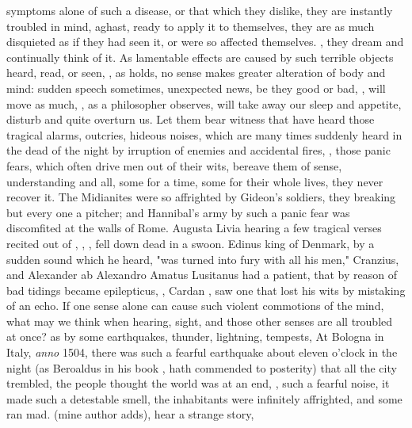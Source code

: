 symptoms alone of such a disease, or that which they dislike, they are
instantly troubled in mind, aghast, ready to apply it to themselves, they are
as much disquieted as if they had seen it, or were so affected themselves.
, they dream and continually think of it. As
lamentable effects are caused by such terrible objects heard, read, or seen,
, as \Plutarch{}
holds, no sense makes greater alteration of body and mind: sudden speech
sometimes, unexpected news, be they good or bad, ,
will move as much, , as a
philosopher observes, will take away our sleep and
appetite, disturb and quite overturn us. Let them bear witness that have heard
those tragical alarms, outcries, hideous noises, which are many times suddenly
heard in the dead of the night by irruption of enemies and accidental fires,
\etc{}, those panic fears, which often drive men out of
their wits, bereave them of sense, understanding and all, some for a time, some
for their whole lives, they never recover it. The
Midianites were so affrighted by Gideon's soldiers, they
breaking but every one a pitcher; and Hannibal's army by
such a panic fear was discomfited at the walls of Rome. Augusta Livia hearing a
few tragical verses recited out of \Virgil{}, , \etc{}, fell
down dead in a swoon. Edinus king of Denmark, by a sudden sound which he heard,
"was turned into fury with all his men," Cranzius,
 and Alexander ab Alexandro
 Amatus Lusitanus had a patient, that by
reason of bad tidings became epilepticus, , Cardan , saw one that lost his wits
by mistaking of an echo. If one sense alone can cause such violent commotions
of the mind, what may we think when hearing, sight, and those other senses are
all troubled at once? as by some earthquakes, thunder, lightning, tempests,
\etc{} At Bologna in Italy, \emph{anno} 1504, there was such a fearful
earthquake about eleven o'clock in the night (as Beroaldus
in his book , hath commended to posterity)
that all the city trembled, the people thought the world was at an end,
, such a fearful noise, it made such a detestable
smell, the inhabitants were infinitely affrighted, and some ran mad.  (mine author adds), hear a strange story,

